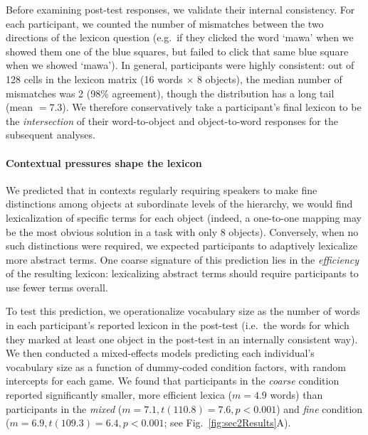 Before examining post-test responses, we validate their internal consistency.
For each participant, we counted the number of mismatches between the two directions of the lexicon question (e.g.\ if they clicked the word `mawa' when we showed them one of the blue squares, but failed to click that same blue square when we showed `mawa'). 
In general, participants were highly consistent: out of 128 cells in the lexicon matrix (16 words $\times$ 8 objects), the median number of mismatches was 2 (98\% agreement), though the distribution has a long tail (mean $= 7.3$). 
We therefore conservatively take a participant's final lexicon to be the \emph{intersection} of their word-to-object and object-to-word responses for the subsequent analyses.

\paragraph{Contextual pressures shape the lexicon}

We predicted that in contexts regularly requiring speakers to make fine distinctions among objects at subordinate levels of the hierarchy, we would find lexicalization of specific terms for each object (indeed, a one-to-one mapping may be the most obvious solution in a task with only 8 objects). 
Conversely, when no such distinctions were required, we expected participants to adaptively lexicalize more abstract terms.
One coarse signature of this prediction lies in the \emph{efficiency} of the resulting lexicon: lexicalizing abstract terms should require participants to use fewer terms overall.

To test this prediction, we operationalize vocabulary size as the number of words in each participant's reported lexicon in the post-test (i.e.\ the words for which they marked at least one object in the post-test in an internally consistent way). 
We then conducted a mixed-effects models predicting each individual's vocabulary size as a function of dummy-coded condition factors, with random intercepts for each game. 
We found that participants in the \emph{coarse} condition reported significantly smaller, more efficient lexica ($m = 4.9$ words) than participants in the \emph{mixed} ($m=7.1, t(110.8)=7.6, p < 0.001$) and \emph{fine} condition ($m = 6.9, t(109.3) = 6.4, p < 0.001$; see Fig.\ \ref{fig:sec2Results}A). 

